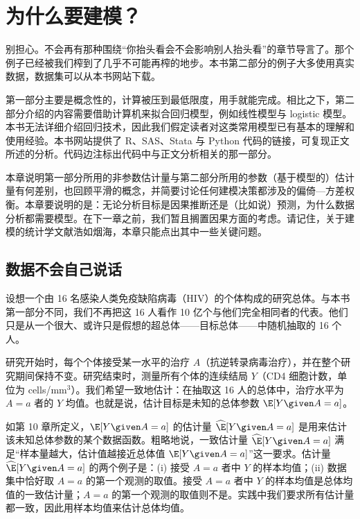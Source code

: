 \chapter{为什么要建模？}

别担心。不会再有那种围绕“你抬头看会不会影响别人抬头看”的章节导言了。那个例子已经被我们榨到了几乎不可能再榨的地步。本书第二部分的例子大多使用真实数据，数据集可以从本书网站下载。

第一部分主要是概念性的，计算被压到最低限度，用手就能完成。相比之下，第二部分介绍的内容需要借助计算机来拟合回归模型，例如线性模型与 logistic 模型。本书无法详细介绍回归技术，因此我们假定读者对这类常用模型已有基本的理解和使用经验。本书网站提供了 R、SAS、Stata 与 Python 代码的链接，可复现正文所述的分析。代码边注标出代码中与正文分析相关的那一部分。

本章说明第一部分所用的非参数估计量与第二部分所用的参数（基于模型的）估计量有何差别，也回顾平滑的概念，并简要讨论任何建模决策都涉及的偏倚—方差权衡。本章要说明的是：无论分析目标是因果推断还是（比如说）预测，为什么数据分析都需要模型。在下一章之前，我们暂且搁置因果方面的考虑。请记住，关于建模的统计学文献浩如烟海，本章只能点出其中一些关键问题。

\section{数据不会自己说话}

设想一个由 16 名感染人类免疫缺陷病毒（HIV）的个体构成的研究总体。与本书第一部分不同，我们不再把这 16 人看作 10 亿个与他们完全相同者的代表。他们只是从一个很大、或许只是假想的超总体——目标总体——中随机抽取的 16 个人。

研究开始时，每个个体接受某一水平的治疗 $A$（抗逆转录病毒治疗），并在整个研究期间保持不变。研究结束时，测量所有个体的连续结局 $Y$（CD4 细胞计数，单位为 cells/mm$^3$）。我们希望一致地估计：在抽取这 16 人的总体中，治疗水平为 $A=a$ 者的 $Y$ 均值。也就是说，估计目标是未知的总体参数 $\E[Y\given A=a]$。

如第 10 章所定义，$\E[Y\given A=a]$ 的估计量 $\widehat{\E}[Y\given A=a]$ 是用来估计该未知总体参数的某个数据函数。粗略地说，一致估计量 $\widehat{\E}[Y\given A=a]$ 满足“样本量越大，估计值越接近总体值 $\E[Y\given A=a]$”这一要求。估计量 $\widehat{\E}[Y\given A=a]$ 的两个例子是：(i) 接受 $A=a$ 者中 $Y$ 的样本均值；(ii) 数据集中恰好取 $A=a$ 的第一个观测的取值。接受 $A=a$ 者中 $Y$ 的样本均值是总体均值的一致估计量；$A=a$ 的第一个观测的取值则不是。实践中我们要求所有估计量都一致，因此用样本均值来估计总体均值。

